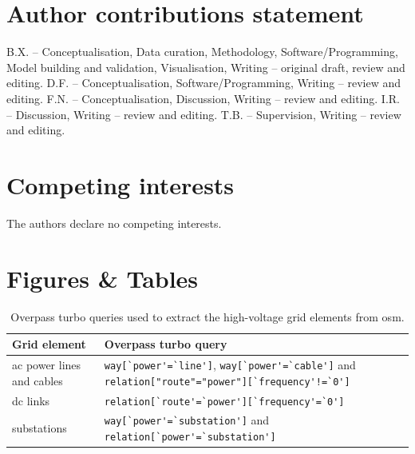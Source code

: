 \documentclass[fleqn,10pt]{wlscirep}
\newcommand{\colorcode}[1]{\colorbox{gray!20}{\lstinline|#1|}}
\begin{document}
\section*{Author contributions statement}
B.X. -- Conceptualisation, Data curation, Methodology, Software/Programming, Model building and validation, Visualisation, Writing -- original draft, review and editing. 
D.F. -- Conceptualisation, Software/Programming, Writing -- review and editing.
F.N. -- Conceptualisation, Discussion, Writing -- review and editing.
I.R. -- Discussion, Writing -- review and editing.
T.B. -- Supervision, Writing -- review and editing.

\section*{Competing interests} %
The authors declare no competing interests.

\newpage
\section*{Figures \& Tables}

\begin{table}[!htbp]
    \centering
    \begin{tabular}{|p{}|p{}|}
    \hline
    \textbf{Grid element} & \textbf{Overpass turbo query}  \\
    \hline
    \acrshort{ac} power lines and cables & \colorcode{way[`power'=`line']}, \colorcode{way[`power'=`cable']} \newline and \colorcode{relation["route"="power"][`frequency'!=`0']} \\
    \hline
    \acrshort{dc} links & \colorcode{relation[`route'=`power'][`frequency'=`0']} \\
    \hline
    substations & \colorcode{way[`power'=`substation']} and \colorcode{relation[`power'=`substation']} \\
    \hline
    \end{tabular}
    \caption{Overpass turbo queries used to extract the high-voltage grid elements from \acrshort{osm}.}
    \label{tab:overpass_queries}
\end{table}
\end{document}

